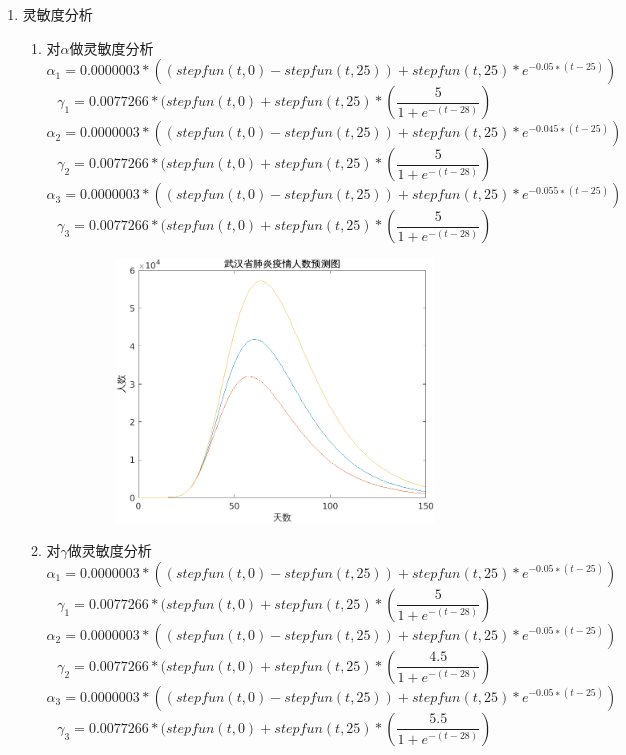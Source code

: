 \documentclass{article}
\begin{document}
\begin{enumerate}
\begin{figure}[h!]
{效的控制,}
                \end{figure}  
\item 灵敏度分析
\begin{enumerate}
\item 对$\alpha$做灵敏度分析
$$\alpha_1 = 0.0000003*((stepfun(t,0)-stepfun(t,25))+stepfun(t,25)*
e^{-0.05 ∗ (t-25)})$$
$$\gamma_1 = 0.0077266*(stepfun(t, 0) +stepfun(t, 25)*(\frac{5}{1 + 
e^{-(t-28)}})$$  
$$\alpha_2 = 0.0000003*((stepfun(t,0)-stepfun(t,25))+stepfun(t,25)*
e^{-0.045 ∗ (t-25)})$$ 
$$\gamma_2 = 0.0077266*(stepfun(t, 0) +stepfun(t, 25)*(\frac{5}{1 + 
e^{-(t-28)}})$$  
$$\alpha_3 = 0.0000003*((stepfun(t,0)-stepfun(t,25))+stepfun(t,25)*
e^{-0.055 ∗ (t-25)})$$
$$\gamma_3 = 0.0077266*(stepfun(t, 0) +stepfun(t, 25)*(\frac{5}{1 + 
e^{-(t-28)}})$$  
 \begin{figure}[h!]
                \centering
                \includegraphics[width=15cm,height=7cm]{9.png}
                \end{figure} 
                \newpage
\item 对$\gamma$做灵敏度分析
$$\alpha_1 = 0.0000003*((stepfun(t,0)-stepfun(t,25))+stepfun(t,25)*
e^{-0.05 ∗ (t-25)})$$
$$\gamma_1 = 0.0077266*(stepfun(t, 0) +stepfun(t, 25)*(\frac{5}{1 + 
e^{-(t-28)}})$$  
$$\alpha_2 = 0.0000003*((stepfun(t,0)-stepfun(t,25))+stepfun(t,25)*
e^{-0.05 ∗ (t-25)})$$ 
$$\gamma_2 = 0.0077266*(stepfun(t, 0) +stepfun(t, 25)*(\frac{4.5}{1 + 
e^{-(t-28)}})$$  
$$\alpha_3 = 0.0000003*((stepfun(t,0)-stepfun(t,25))+stepfun(t,25)*
e^{-0.05 ∗ (t-25)})$$
$$\gamma_3 = 0.0077266*(stepfun(t, 0) +stepfun(t, 25)*(\frac{5.5}{1 + 
e^{-(t-28)}})$$  

\end{enumerate}
\end{enumerate}
\end{document}
